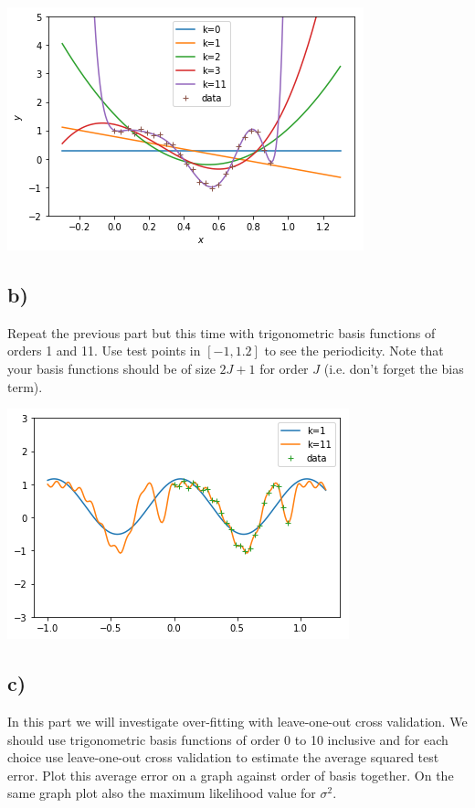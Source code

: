 \documentclass[12pt,twoside]{article}
\begin{document}
\begin{center}
	\includegraphics{../index}	     
\end{center}

\subsection*{b)} Repeat the previous part but this time with trigonometric basis functions of orders 1 and 11. Use test points in $[-1, 1.2]$ to see the periodicity. Note that your basis functions should be of size $2J + 1$ for order $J$ (i.e. don’t forget the bias term).

\begin{center}
	\includegraphics{../index1}	     
\end{center}

\subsection*{c)} In this part we will investigate over-fitting with leave-one-out cross validation. We should use trigonometric basis functions of order 0 to 10 inclusive and for each choice use leave-one-out cross validation to estimate the average squared test error. Plot this average error on a graph against order of basis together. On the same graph plot also the maximum likelihood value for $\sigma^2$.
\end{document}
